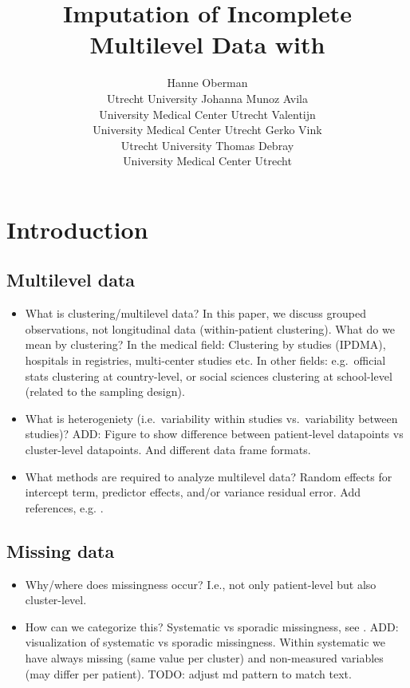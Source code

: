\documentclass[
]{jss}
\author{
Hanne Oberman\\Utrecht University \And Johanna Munoz Avila\\University
Medical Center Utrecht \And Valentijn\\University Medical Center Utrecht
\AND Gerko Vink\\Utrecht University \And Thomas Debray\\University
Medical Center Utrecht
}
\title{Imputation of Incomplete Multilevel Data with \pkg{mice}}
\begin{document}
\hypertarget{introduction}{%
\section{Introduction}\label{introduction}}

\hypertarget{multilevel-data}{%
\subsection{Multilevel data}\label{multilevel-data}}

\begin{itemize}
\item
  What is clustering/multilevel data? In this paper, we discuss grouped
  observations, not longitudinal data (within-patient clustering). What
  do we mean by clustering? In the medical field: Clustering by studies
  (IPDMA), hospitals in registries, multi-center studies etc. In other
  fields: e.g.~official stats clustering at country-level, or social
  sciences clustering at school-level (related to the sampling design).
\item
  What is heterogeniety (i.e.~variability within studies vs.~variability
  between studies)? ADD: Figure to show difference between patient-level
  datapoints vs cluster-level datapoints. And different data frame
  formats.
\item
  What methods are required to analyze multilevel data? Random effects
  for intercept term, predictor effects, and/or variance residual error.
  Add references, e.g. \citet{hox17}.
\end{itemize}

\hypertarget{missing-data}{%
\subsection{Missing data}\label{missing-data}}

\begin{itemize}
\item
  Why/where does missingness occur? I.e., not only patient-level but
  also cluster-level.
\item
  How can we categorize this? Systematic vs sporadic missingness, see
  \citet{resc13}. ADD: visualization of systematic vs sporadic
  missingness. Within systematic we have always missing (same value per
  cluster) and non-measured variables (may differ per patient). TODO:
  adjust md pattern to match text.
\end{itemize}
\end{document}
